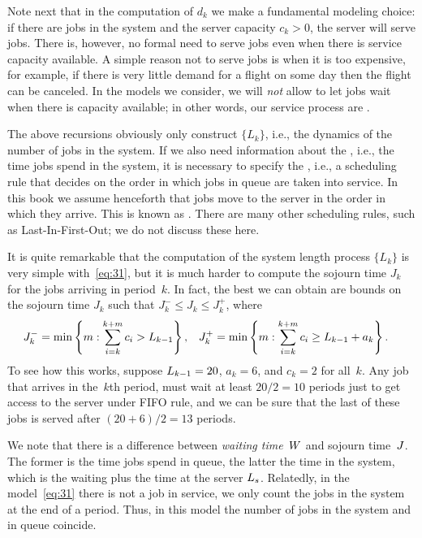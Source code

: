 \documentclass[stochastic-or.tex]{subfiles}
\begin{document}
Note next that in the computation of $d_{k}$ we make a fundamental modeling choice: if there are jobs in the system and the server capacity $c_{k} > 0$, the server will serve jobs.
There is, however, no formal need to serve jobs even when there is service capacity available.
A simple reason not to serve jobs is when it is too expensive, for example, if there is very little demand for a flight on some day then the flight can be canceled.
In the models we consider, we will \emph{not} allow to let jobs wait when there is capacity available; in other words, our service process are .

The above recursions obviously only construct $\{L_k\}$, i.e., the dynamics of the number of jobs in the system.
If we also need information about the , i.e., the time jobs spend in the system, it is necessary to specify the , i.e., a scheduling rule that decides on the order in which jobs in queue are taken into service.
In this book we assume henceforth that jobs move to the server in the order in which they arrive.
This is known as .
There are many other scheduling rules, such as Last-In-First-Out; we do not discuss these here.

It is quite remarkable that the computation of the system length process $\{L_{k}\}$ is very simple with~\cref{eq:31}, but it is much harder to compute the sojourn time $J_{k}$ for the jobs arriving in period~$k$.
In fact, the best we can obtain are bounds on the sojourn time $J_{k}$ such that $J_k^{-} \leq J_{k}\leq J_k^{+}$, where
 \begin{align*}
 J_{k}^{-} &= \min\left\{m: \sum_{i=k}^{k+m} c_i > L_{k-1}\right\}, &
 J_{k}^{+} &= \min\left\{m: \sum_{i=k}^{k+m} c_i \geq  L_{k-1}+a_k\right\}.
 \end{align*}
 To see how this works, suppose $L_{k-1}=20$, $a_{k}=6$, and $c_k=2$ for all~$k$.
Any job that arrives in the~$k$th period, must wait at least $20/2 = 10$ periods just to get access to the server under FIFO rule, and we can be sure that the last of these jobs is served after $(20+6)/2=13$ periods.

We note that there is a difference between \emph{waiting time}~$W$ and sojourn time~$J$.
The former is the time jobs spend in queue, the latter the time in the system, which is the waiting plus the time at the server $L_s$.
Relatedly, in the model~\cref{eq:31} there is not a job in service, we only count the jobs in the system at the end of a period. Thus, in this model the number of jobs in the system and in queue coincide.
\end{document}
